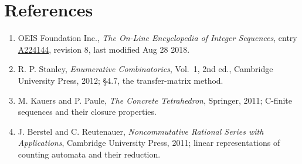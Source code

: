 \documentclass[11pt]{article}
\theoremstyle{definition}
\begin{document}
\section{References}

\begin{enumerate}

\item OEIS Foundation Inc., \emph{The On-Line Encyclopedia of Integer Sequences}, entry \href{https://oeis.org/A224144}{A224144}, revision 8, last modified Aug 28 2018.

\item R. P. Stanley, \emph{Enumerative Combinatorics}, Vol.~1, 2nd ed., Cambridge University Press, 2012; \S4.7, the transfer-matrix method.

\item M. Kauers and P. Paule, \emph{The Concrete Tetrahedron}, Springer, 2011; C-finite sequences and their closure properties.

\item J. Berstel and C. Reutenauer, \emph{Noncommutative Rational Series with Applications}, Cambridge University Press, 2011; linear representations of counting automata and their reduction.

\end{enumerate}
\end{document}
